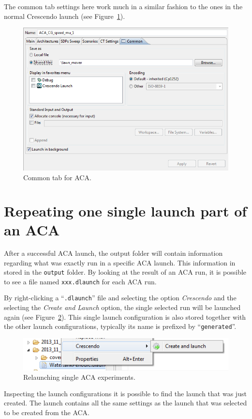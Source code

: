 \documentclass{crescendorepchap}
\begin{document}
The common tab settings here work much in a similar fashion to the ones in
the normal
Crescendo launch (see Figure~\ref{fig:CommontabACA}). 

\begin{figure}[htbp]
\centering
\includegraphics[width=.6\textwidth]{images/CommontabACA.png}
\caption{Common tab for ACA.\label{fig:CommontabACA}}
\end{figure}

\section{Repeating one single launch part of an ACA}

After a successful ACA launch, the output folder will contain
information regarding what was exactly run in a specific ACA launch.
This information in stored in the \texttt{output} folder. By looking at
the result of an ACA run, it is possible
to see a file named \texttt{xxx.dlaunch} for each ACA run.

By right-clicking a ``\texttt{.dlaunch}'' file and selecting the option
\emph{Crescendo} and the selecting the \emph{Create and Launch} option, 
the single selected run will
be launched again (see Figure~\ref{fig:CreateAndLaunchCommand}). 
This single launch configuration is also stored
together with the other launch configurations, typically its name is
prefixed by ``\texttt{generated}''.

\begin{figure}[htbp]
\centering
\includegraphics[width=.6\textwidth]{images/CreateAndLaunchCommand.png}
\caption{Relaunching single ACA experiments.\label{fig:CreateAndLaunchCommand}}
\end{figure}

Inspecting the launch configurations it is possible to find the launch
that was just created. The launch contains all the same settings as the
launch that was selected to be created from the ACA.
\end{document}
